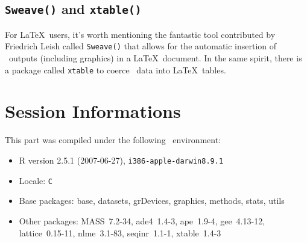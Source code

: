 \documentclass{article}
\begin{document}
\subsection{\texttt{Sweave()} and \texttt{xtable()}}

For \LaTeX~users, it's
worth mentioning the fantastic tool contributed by Friedrich Leish \cite{Sweave}
called \texttt{Sweave()} that allows for the automatic insertion
of \Rlogo{}~outputs (including graphics) in a \LaTeX~document. In the same spirit, there
is a package called \texttt{xtable} \cite{xtable} to coerce \Rlogo{}~data into \LaTeX~tables.


\section{Session Informations}

This part was compiled under the following \Rlogo{}~environment:

\begin{itemize}
  \item R version 2.5.1 (2007-06-27), \verb|i386-apple-darwin8.9.1|
  \item Locale: \verb|C|
  \item Base packages: base, datasets, grDevices, graphics, methods,
    stats, utils
  \item Other packages: MASS~7.2-34, ade4~1.4-3, ape~1.9-4,
    gee~4.13-12, lattice~0.15-11, nlme~3.1-83, seqinr~1.1-1,
    xtable~1.4-3
\end{itemize}


\clearpage
{}


\end{document}
